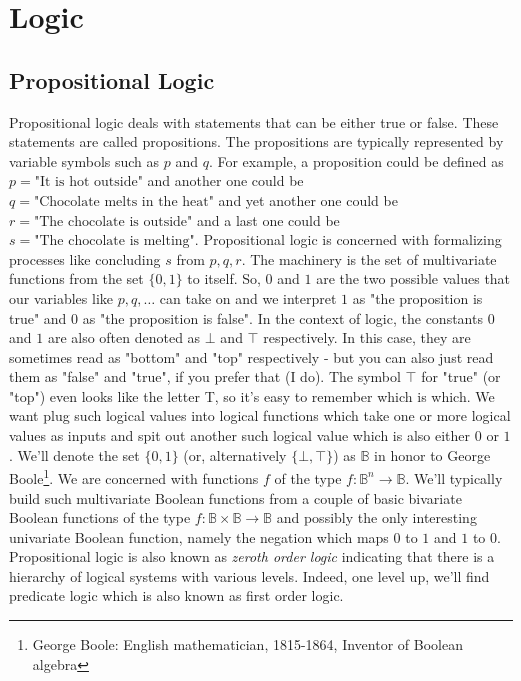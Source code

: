 \chapter{Logic}


\section{Propositional Logic}
Propositional logic deals with statements that can be either true or false. These statements are called propositions. The propositions are typically represented by variable symbols such as $p$ and $q$. For example, a proposition could be defined as $p = \text{"It is hot outside"}$ and another one could be $q = \text{"Chocolate melts in the heat"}$ and yet another one could be $r = \text{"The chocolate is outside"}$ and a last one could be $s = \text{"The chocolate is melting"}$. Propositional logic is concerned with formalizing processes like concluding $s$ from $p,q,r$. The machinery is the set of multivariate functions from the set $\{0,1\}$ to itself. So, $0$ and $1$ are the two possible values that our variables like $p,q,\ldots$ can take on and we interpret $1$ as "the proposition is true" and $0$ as "the proposition is false". In the context of logic, the constants $0$ and $1$ are also often denoted as $\bot$ and $\top$ respectively. In this case, they are sometimes read as "bottom" and "top" respectively - but you can also just read them as "false" and "true", if you prefer that (I do). The symbol $\top$ for "true" (or "top") even looks like the letter T, so it's easy to remember which is which. We want plug such logical values into logical functions which take one or more logical values as inputs and spit out another such logical value which is also either $0$ or $1$. We'll denote the set $\{0,1\}$ (or, alternatively $\{\bot, \top\}$) as $\mathbb{B}$ in honor to George Boole\footnote{George Boole: English mathematician, 1815-1864, Inventor of Boolean algebra}. We are concerned with functions $f$ of the type $f: \mathbb{B}^n \rightarrow \mathbb{B}$. We'll typically build such multivariate Boolean functions from a couple of basic bivariate Boolean functions of the type $f: \mathbb{B} \times \mathbb{B} \rightarrow \mathbb{B}$ and possibly the only interesting univariate Boolean function, namely the negation which maps $0$ to $1$ and $1$ to $0$.  Propositional logic is also known as \emph{zeroth order logic} indicating that there is a hierarchy of logical systems with various levels. Indeed, one level up, we'll find predicate logic which is also known as first order logic. 

